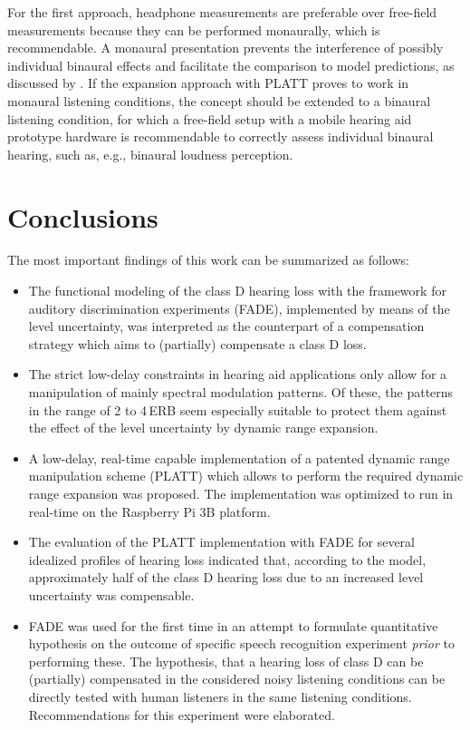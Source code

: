 \documentclass[10pt,a4paper,twocolumn]{article}
\begin{document}
For the first approach, headphone measurements are preferable over free-field measurements because they can be performed monaurally, which is recommendable.
%
A monaural presentation prevents the interference of possibly individual binaural effects and facilitate the comparison to model predictions, as discussed by \cite{schaedler2020a}.
%
If the expansion approach with PLATT proves to work in monaural listening conditions, the concept should be extended to a binaural listening condition, for which a free-field setup with a mobile hearing aid prototype hardware is recommendable to correctly assess individual binaural hearing, such as, e.g., binaural loudness perception.

\section*{Conclusions}
\label{sec:conclusion}
The most important findings of this work can be summarized as follows:
\begin{itemize}
	\item The functional modeling of the class D hearing loss with the framework for auditory discrimination experiments (FADE), implemented by means of the level uncertainty, was interpreted as the counterpart of a compensation strategy which aims to (partially) compensate a class D loss.
	\item The strict low-delay constraints in hearing aid applications only allow for a manipulation of mainly spectral modulation patterns. Of these, the patterns in the range of 2 to 4\,ERB seem especially suitable to protect them against the effect of the level uncertainty by dynamic range expansion.
	\item A low-delay, real-time capable implementation of a patented dynamic range manipulation scheme (PLATT) which allows to perform the required dynamic range expansion was proposed. The implementation was optimized to run in real-time on the Raspberry Pi 3B platform.
	\item The evaluation of the PLATT implementation with FADE for several idealized profiles of hearing loss indicated that, according to the model, approximately half of the class D hearing loss due to an increased level uncertainty was compensable.
	\item FADE was used for the first time in an attempt to formulate quantitative hypothesis on the outcome of specific speech recognition experiment \emph{prior} to performing these. The hypothesis, that a hearing loss of class D can be (partially) compensated in the considered noisy listening conditions can be directly tested with human listeners in the same listening conditions. Recommendations for this experiment were elaborated.
\end{itemize}
\end{document}
